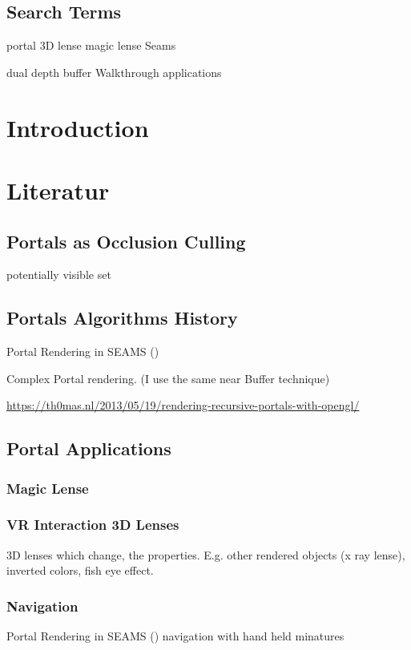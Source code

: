 
\subsection*{Search Terms}
portal
3D lense
magic lense
Seams

dual depth buffer
Walkthrough applications
\section{Introduction}

\section{Literatur}

\subsection{Portals as Occlusion Culling}
potentially visible set
\cite{luebke:1995:portals}
\cite{yang:2014:walkthrough}

\subsection{Portals Algorithms History}


Portal Rendering in SEAMS (\cite{schmalstieg:1999:sewing})

Complex Portal rendering. (I use the same near Buffer technique) \cite{ lowe:2005:technique}


\url{https://th0mas.nl/2013/05/19/rendering-recursive-portals-with-opengl/}
\subsection{Portal Applications}

\subsubsection{Magic Lense}
\cite{viega:1996:3d}


\subsubsection{VR Interaction 3D Lenses}
\cite{borst:2009:real}
3D lenses which change, the properties. E.g. other rendered objects (x ray lense), inverted colors, fish eye effect.

\subsubsection{Navigation}
Portal Rendering in SEAMS (\cite{schmalstieg:1999:sewing})
\cite{pausch:1995:navigation} navigation with hand held minatures



